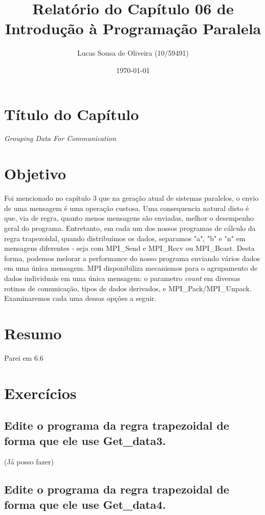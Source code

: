 \documentclass[11pt,a4paper,onecolumn]{article}
\title{Relatório do Capítulo 06 de\\Introdução à Programação Paralela}
\author{Lucas Sousa de Oliveira (10/59491)}
\date{\today}
\begin{document}
\maketitle

\section{Título do Capítulo}
\textit{Grouping Data For Communication}

\section{Objetivo}
Foi mencionado no capítulo 3 que na geração atual de sistemas paralelos, o envio de uma mensagem é uma operação custosa.
Uma consequencia natural disto é que, via de regra, quanto menos mensagens são enviadas, melhor o desempenho geral do programa.
Entretanto, em cada um dos nossos programas de cálculo da regra trapezoidal, quando distribuímos os dados, separamos "a", "b" e "n" em mensagens diferentes - seja com MPI\_Send e MPI\_Recv ou MPI\_Bcast.
Desta forma, podemos melorar a performance do nosso programa enviando vários dados em uma única mensagem.
MPI disponibiliza mecanismos para o agrupamento de dados individuais em uma única mensagem: o parametro \textit{count} em diversas rotinas de comunicação, tipos de dados derivados, e MPI\_Pack/MPI\_Unpack.
Examinaremos cada uma dessas opções a seguir.

\section{Resumo}
\label{sec:resumo}

Parei em 6.6

\section{Exercícios}
\subsection{Edite o programa da regra trapezoidal de forma que ele use Get\_data3.} (Já posso fazer)


\subsection{Edite o programa da regra trapezoidal de forma que ele use Get\_data4.}

\end{document}
